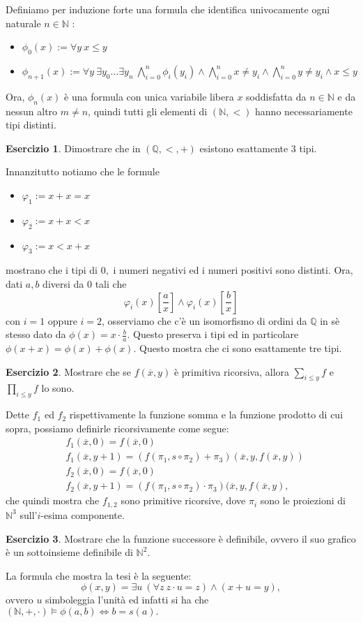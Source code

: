 \documentclass[a4paper]{article}
\newcommand{\Q}{\mathbb{Q}}
\newcommand{\N}{\mathbb{N}}
\theoremstyle{definition}
\theoremstyle{definition}
\theoremstyle{remark}
\theoremstyle{definition}
\newtheorem*{exercise*}{Esercizio}
\begin{document}
Definiamo per induzione forte una formula che identifica univocamente ogni naturale $n\in\N$ :
\begin{itemize}
	\item $\phi_0(x):=\forall y~x\leq y$
	\item $\phi_{n+1}(x):=\forall y~\exists y_0\ldots\exists y_n~\bigwedge_{i=0}^n{\phi_i(y_i)}\land\bigwedge_{i=0}^n{x\neq y_i}\land\bigwedge_{i=0}^n{y\neq y_i}\land x\leq y$
\end{itemize}
Ora, $\phi_n(x)$ è una formula con unica variabile libera $x$ soddisfatta da $n\in\N$ e da nessun altro $m\neq n$, quindi tutti gli elementi di $(\N,<)$ hanno necessariamente tipi distinti.
\begin{exercise*}
	Dimostrare che in $(\Q,<,+)$ esistono esattamente 3 tipi.
\end{exercise*}
Innanzitutto notiamo che le formule
\begin{itemize}
	\item $\varphi_1:=x+x=x$
	\item $\varphi_2:=x+x<x$
	\item $\varphi_3:=x<x+x$
\end{itemize}
mostrano che i tipi di $0,$ i numeri negativi ed i numeri positivi sono distinti.
Ora, dati $a,b$ diversi da $0$ tali che $$ \varphi_i(x)[\frac{a}{x}] \land \varphi_i(x)[\frac{b}{x}] $$ con $i=1$ oppure $i=2$, osserviamo che c'è un isomorfismo di ordini da $\Q$
in sè stesso dato da $\phi(x)=x\cdot \frac{b}{a}$. Questo preserva i tipi ed in particolare $\phi(x+x)=\phi(x)+\phi(x).$ Questo mostra che ci sono esattamente tre tipi.
\begin{exercise*}
	Mostrare che se $f(\overline{x},y)$ è primitiva ricorsiva, allora $\sum_{i\leq y}{f}$ e $\prod_{i\leq y}{f}$ lo sono.
\end{exercise*}
Dette $f_1$ ed $f_2$ rispettivamente la funzione somma e la funzione prodotto di cui sopra, possiamo definirle ricorsivamente come segue: \begin{align*}
&f_1(\overline{x},0)=f(\overline{x},0)\\
&f_1(\overline{x},y+1)=(f(\pi_1,s\circ\pi_2)+\pi_3)\left(  \overline{x},y,f(\overline{x},y) \right) \\
&f_2(\overline{x},0)=f(\overline{x},0)\\
&f_2(\overline{x},y+1)=(f(\pi_1,s\circ\pi_2)\cdot\pi_3)(\overline{x},y,f(\overline{x},y),\end{align*}
che quindi mostra che $f_{1,2}$ sono primitive ricorsive, dove $\pi_i$ sono le proiezioni di $\N^3$ sull'$i$-esima componente.
\begin{exercise*}
	Mostrare che la funzione successore è definibile, ovvero il suo grafico è un sottoinsieme definibile di $\N^2$.
\end{exercise*}
La formula che mostra la tesi è la seguente: $$ \phi(x,y)=\exists u~ (\forall z~z\cdot u=z)\land (x+u=y) ,$$
ovvero $u$ simboleggia l'unità ed infatti si ha che $(\N,+,\cdot)\models\phi(a,b)\iff b=s(a).$
\end{document}
